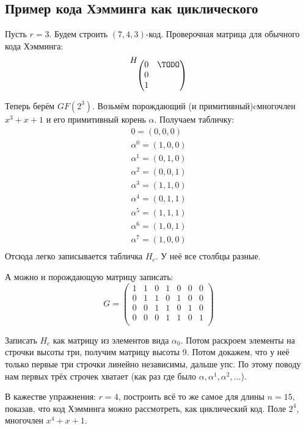 \subsection{Пример кода Хэмминга как циклического}
Пусть $r=3$.
Будем строить $(7, 4, 3)$-код.
Проверочная матрица для обычного кода Хэмминга:
\[
H_{\begin{pmatrix}
0 & \TODO \\
0 & \\
1 & \\
\end{pmatrix}}
\]

Теперь берём $GF(2^3)$.
Возьмём порождающий (и примитивный)cмногочлен $x^3+x+1$ и его примитивный корень $\alpha$.
Получаем табличку:
\begin{align*}
0 = (0, 0, 0) \\
\alpha^0 = (1, 0, 0) \\
\alpha^1 = (0, 1, 0) \\
\alpha^2 = (0, 0, 1) \\
\alpha^3 = (1, 1, 0) \\
\alpha^4 = (0, 1, 1) \\
\alpha^5 = (1, 1, 1) \\
\alpha^6 = (1, 0, 1) \\
\alpha^7 = (1, 0, 0) \\
\end{align*}
Отсюда легко записывается табличка $H_c$.
У неё все столбцы разные.

А можно и порождающую матрицу записать:
\[
G=\begin{pmatrix}
1 & 1 & 0 & 1 & 0 & 0 & 0 \\
0 & 1 & 1 & 0 & 1 & 0 & 0 \\
0 & 0 & 1 & 1 & 0 & 1 & 0 \\
0 & 0 & 0 & 1 & 1 & 0 & 1 \\
\end{pmatrix}
\]

\begin{Exercise}
Записать $H_c$ как матрицу из элементов вида $\alpha_0$.
Потом раскроем элементы на строчки высоты три, получим матрицу высоты 9.
Потом докажем, что у неё только первые три строчки линейно независимы, дальше упс.
По этому поводу нам первых трёх строчек хватает (как раз где было $\alpha, \alpha^1, \alpha^2, \dots$).
\end{Exercise}

\begin{Exercise}
В кажестве упражнения: $r=4$, построить всё то же самое для длины $n=15$,
показав, что код Хэмминга можно рассмотреть, как циклический код.
Поле $2^4$, многочлен $x^4+x+1$.
\end{Exercise}
